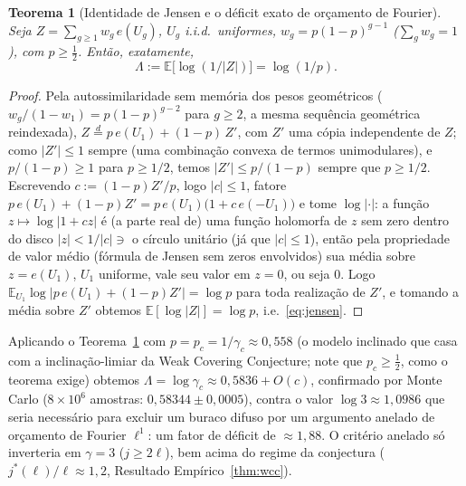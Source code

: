 \documentclass[11pt]{article}
\newtheorem{theorem}{Teorema}[section]
\theoremstyle{definition}
\theoremstyle{remark}
\begin{document}
\begin{theorem}[Identidade de Jensen e o déficit exato de orçamento de
Fourier]\label{thm:jensen}
Seja $Z=\sum_{g\ge1} w_g\, e(U_g)$, $U_g$ i.i.d.\ uniformes, $w_g =
p(1-p)^{g-1}$ ($\sum_g w_g=1$), com $p\ge\tfrac12$. Então, exatamente,
\begin{equation}\label{eq:jensen}
  \Lambda := \mathbb{E}\bigl[\log(1/|Z|)\bigr] = \log(1/p).
\end{equation}
\end{theorem}

\begin{proof}
Pela autossimilaridade sem memória dos pesos geométricos
($w_g/(1-w_1)=p(1-p)^{g-2}$ para $g\ge2$, a mesma sequência geométrica
reindexada), $Z \overset{d}{=} p\, e(U_1) + (1-p)\, Z'$, com $Z'$ uma
cópia independente de $Z$; como $|Z'|\le 1$ sempre (uma combinação
convexa de termos unimodulares), e $p/(1-p)\ge 1$ para $p\ge1/2$,
temos $|Z'|\le p/(1-p)$ sempre que $p\ge1/2$. Escrevendo $c:=(1-p)Z'/p$,
logo $|c|\le1$, fatore $p\,e(U_1)+(1-p)Z' = p\,e(U_1)\bigl(1+c\,e(-U_1)\bigr)$
e tome $\log|\cdot|$: a função $z\mapsto\log|1+cz|$ é (a parte real de)
uma função holomorfa de $z$ sem zero dentro do disco $|z|<1/|c|\ni$ o
círculo unitário (já que $|c|\le1$), então pela propriedade de valor
médio (fórmula de Jensen sem zeros envolvidos) sua média sobre
$z=e(U_1)$, $U_1$ uniforme, vale seu valor em $z=0$, ou seja $0$. Logo
$\mathbb{E}_{U_1}\log|p\,e(U_1)+(1-p)Z'| = \log p$ para toda
realização de $Z'$, e tomando a média sobre $Z'$ obtemos
$\mathbb{E}[\log|Z|]=\log p$, i.e.\ \eqref{eq:jensen}.
\end{proof}

Aplicando o Teorema~\ref{thm:jensen} com $p=p_c=1/\gamma_c\approx0{,}558$
(o modelo inclinado que casa com a inclinação-limiar da Weak Covering
Conjecture; note que $p_c\ge\tfrac12$, como o teorema exige) obtemos
$\Lambda = \log\gamma_c \approx 0{,}5836+O(c)$,
confirmado por Monte Carlo ($8\times10^6$ amostras: $0{,}58344\pm0{,}0005$),
contra o valor $\log 3\approx 1{,}0986$ que seria necessário para
excluir um buraco difuso por um argumento anelado de orçamento de
Fourier $\ell^1$: um fator de déficit de $\approx 1{,}88$. O critério
anelado só inverteria em $\gamma=3$ ($j\ge 2\ell$), bem acima do regime
da conjectura ($j^\ast(\ell)/\ell\approx1{,}2$, Resultado Empírico~\ref{thm:wcc}).
\end{document}
